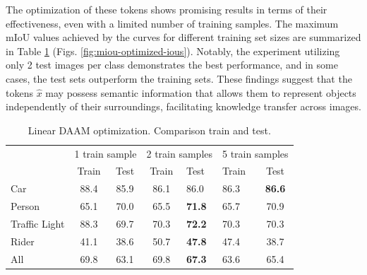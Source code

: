 The optimization of these tokens shows promising results in terms of their effectiveness, even with a limited number of training samples. The maximum mIoU values achieved by the curves for different training set sizes are summarized in Table \ref{tab:linear-daam-max-iou-train-test} (Figs. \ref{fig:miou-optimized-ious}). Notably, the experiment utilizing only 2 test images per class demonstrates the best performance, and in some cases, the test sets outperform the training sets. These findings suggest that the tokens $\hat{x}$ may possess semantic information that allows them to represent objects independently of their surroundings, facilitating knowledge transfer across images.



\begin{table}[ht]
\centering
\begin{tabular}{l|cc|cl|lc|}
\cline{2-7}
\multirow{2}{*}{}                   & \multicolumn{2}{c|}{1 train sample} & \multicolumn{2}{c|}{2 train samples} & \multicolumn{2}{l|}{5 train samples} \\ \cline{2-7} 
                                    & \multicolumn{1}{c|}{Train}  & Test  & \multicolumn{1}{c|}{Train}   & Test  & \multicolumn{1}{l|}{Train}   & Test  \\ \hline
\multicolumn{1}{|l|}{Car}           & \multicolumn{1}{c|}{88.4}   & 85.9  & \multicolumn{1}{c|}{86.1}    & 86.0  & \multicolumn{1}{l|}{86.3}    & \textbf{86.6}  \\
\multicolumn{1}{|l|}{Person}        & \multicolumn{1}{c|}{65.1}   & 70.0  & \multicolumn{1}{c|}{65.5}    & \textbf{71.8}  & \multicolumn{1}{l|}{65.7}    & 70.9  \\
\multicolumn{1}{|l|}{Traffic Light} & \multicolumn{1}{c|}{88.3}   & 69.7  & \multicolumn{1}{c|}{70.3}    & \textbf{72.2}  & \multicolumn{1}{l|}{70.3}    & 70.3  \\
\multicolumn{1}{|l|}{Rider}         & \multicolumn{1}{c|}{41.1}   & 38.6  & \multicolumn{1}{c|}{50.7}    & \textbf{47.8}  & \multicolumn{1}{l|}{47.4}    & 38.7  \\ \hline
\multicolumn{1}{|l|}{All}           & \multicolumn{1}{c|}{69.8}   & 63.1  & \multicolumn{1}{c|}{69.8}    & \textbf{67.3}  & \multicolumn{1}{l|}{63.6}    & 65.4  \\ \hline
\end{tabular}
\caption[Linear DAAM optimization. Comparison train and test]{Linear DAAM optimization. Comparison train and test.}
    \label{tab:linear-daam-max-iou-train-test}
\end{table}


